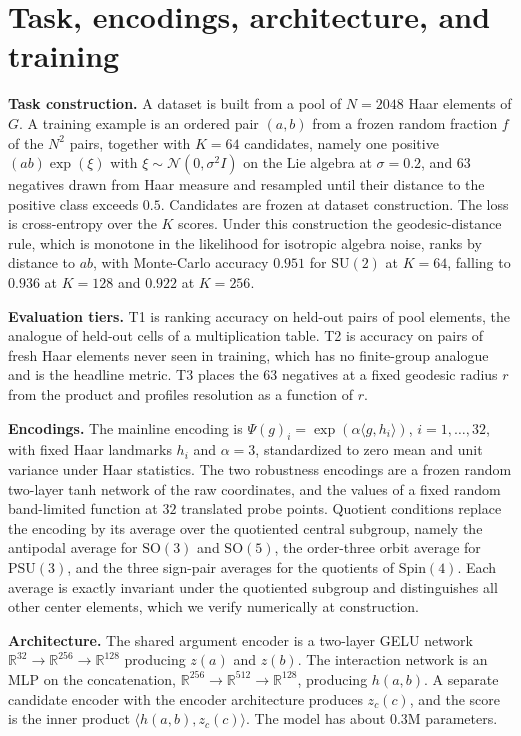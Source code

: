 \documentclass{article}
\newcommand{\SU}{\mathrm{SU}}
\newcommand{\SO}{\mathrm{SO}}
\newcommand{\PSU}{\mathrm{PSU}}
\newcommand{\Spin}{\mathrm{Spin}}
\newcommand{\R}{\mathbb{R}}
\begin{document}
\section{Task, encodings, architecture, and training}
\label{app:details}

\textbf{Task construction.} A dataset is built from a pool of $N =
2048$ Haar elements of $G$. A training example is an ordered pair
$(a,b)$ from a frozen random fraction $f$ of the $N^2$ pairs, together
with $K = 64$ candidates, namely one positive $(ab)\exp(\xi)$ with
$\xi \sim \mathcal N(0, \sigma^2 I)$ on the Lie algebra at
$\sigma = 0.2$, and $63$ negatives drawn from Haar measure and
resampled until their distance to the positive class exceeds $0.5$.
Candidates are frozen at dataset construction. The loss is
cross-entropy over the $K$ scores. Under this construction the geodesic-distance rule, which is monotone in
the likelihood for isotropic algebra noise, ranks by distance to $ab$,
with Monte-Carlo accuracy $0.951$ for $\SU(2)$ at $K = 64$, falling to
$0.936$ at $K = 128$ and $0.922$ at $K = 256$.

\textbf{Evaluation tiers.} T1 is ranking accuracy on held-out pairs of
pool elements, the analogue of held-out cells of a multiplication
table. T2 is accuracy on pairs of fresh Haar elements never seen in
training, which has no finite-group analogue and is the headline
metric. T3 places the $63$ negatives at a fixed geodesic radius $r$
from the product and profiles resolution as a function of $r$.

\textbf{Encodings.} The mainline encoding is
$\Psi(g)_i = \exp(\alpha\langle g, h_i \rangle)$, $i = 1, \dots, 32$,
with fixed Haar landmarks $h_i$ and $\alpha = 3$, standardized to zero
mean and unit variance under Haar statistics. The two robustness
encodings are a frozen random two-layer tanh network of the raw
coordinates, and the values of a fixed random band-limited function at
$32$ translated probe points. Quotient conditions replace the encoding
by its average over the quotiented central subgroup, namely the
antipodal average for $\SO(3)$ and $\SO(5)$, the order-three orbit
average for $\PSU(3)$, and the three sign-pair averages for the
quotients of $\Spin(4)$. Each average is exactly invariant under the
quotiented subgroup and distinguishes all other center elements, which
we verify numerically at construction.

\textbf{Architecture.} The shared argument encoder is a two-layer GELU
network $\R^{32} \to \R^{256} \to \R^{128}$ producing $z(a)$ and
$z(b)$. The interaction network is an MLP on the concatenation,
$\R^{256} \to \R^{512} \to \R^{128}$, producing $h(a,b)$. A separate
candidate encoder with the encoder architecture produces $z_c(c)$, and
the score is the inner product $\langle h(a,b), z_c(c)\rangle$. The
model has about $0.3$M parameters.
\end{document}

